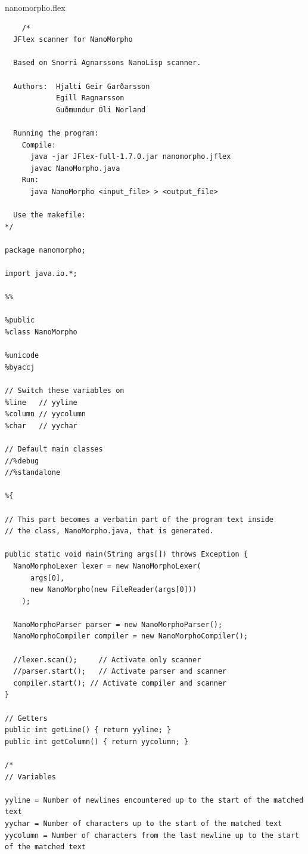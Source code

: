 \documentclass{homework}
\begin{document}
\newpage
\begin{question}{nanomorpho.flex}
\end{question}
\begin{answer}
  \begin{verbatim}
    /*
  JFlex scanner for NanoMorpho

  Based on Snorri Agnarssons NanoLisp scanner.

  Authors:  Hjalti Geir Garðarsson
            Egill Ragnarsson
            Guðmundur Óli Norland
  
  Running the program:
    Compile:
      java -jar JFlex-full-1.7.0.jar nanomorpho.jflex
      javac NanoMorpho.java
    Run:
      java NanoMorpho <input_file> > <output_file>
  
  Use the makefile:
*/

package nanomorpho;

import java.io.*;

%%

%public
%class NanoMorpho

%unicode
%byaccj

// Switch these variables on
%line   // yyline
%column // yycolumn
%char   // yychar

// Default main classes
//%debug
//%standalone

%{

// This part becomes a verbatim part of the program text inside
// the class, NanoMorpho.java, that is generated.

public static void main(String args[]) throws Exception {  
  NanoMorphoLexer lexer = new NanoMorphoLexer(
      args[0],
      new NanoMorpho(new FileReader(args[0]))
    );

  NanoMorphoParser parser = new NanoMorphoParser();
  NanoMorphoCompiler compiler = new NanoMorphoCompiler();

  //lexer.scan();     // Activate only scanner
  //parser.start();   // Activate parser and scanner
  compiler.start(); // Activate compiler and scanner
}

// Getters
public int getLine() { return yyline; }
public int getColumn() { return yycolumn; }

/*
// Variables

yyline = Number of newlines encountered up to the start of the matched text
yychar = Number of characters up to the start of the matched text
yycolumn = Number of characters from the last newline up to the start of the matched text


\end{verbatim}
\end{answer}
\end{document}
